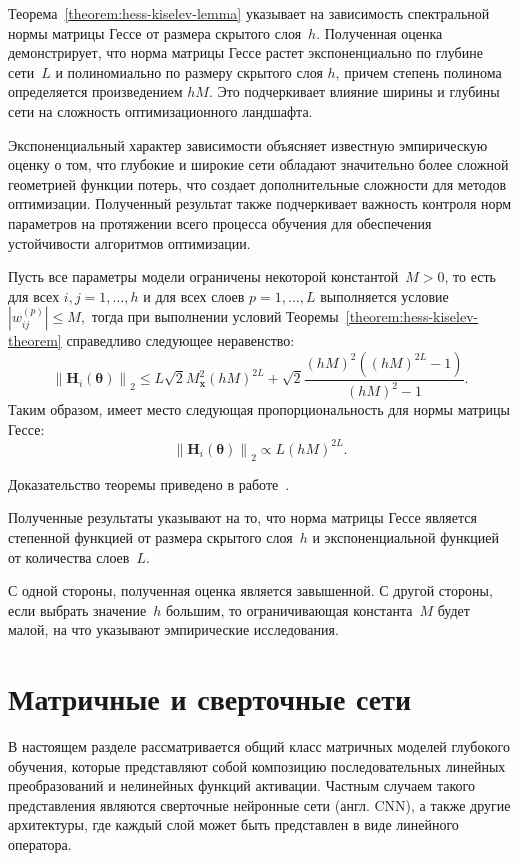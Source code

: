 Теорема~\ref{theorem:hess-kiselev-lemma} указывает на зависимость спектральной нормы матрицы Гессе от размера скрытого слоя~$h$. Полученная оценка демонстрирует, что норма матрицы Гессе растет экспоненциально по глубине сети~$L$ и полиномиально по размеру скрытого слоя $h$, причем степень полинома определяется произведением $hM$. Это подчеркивает влияние ширины и глубины сети на сложность оптимизационного ландшафта.

Экспоненциальный характер зависимости объясняет известную эмпирическую оценку о том, что глубокие и широкие сети обладают значительно более сложной геометрией функции потерь, что создает дополнительные сложности для методов оптимизации. Полученный результат также подчеркивает важность контроля норм параметров на протяжении всего процесса обучения для обеспечения устойчивости алгоритмов оптимизации.

\begin{theorem}\label{theorem:hess-kiselev-lemma}
    Пусть все параметры модели ограничены некоторой константой~$M > 0$, то есть для всех $i, j = 1, \ldots, h$ и для всех слоев $p = 1, \ldots, L$ выполняется условие~$|w_{ij}^{(p)}| \leqslant M,$ тогда при выполнении условий Теоремы~\ref{theorem:hess-kiselev-theorem} справедливо следующее неравенство:
    \[ 
        \left\| \mathbf{H}_i(\boldsymbol{\theta}) \right\|_2 \leqslant L \sqrt{2} M_{\mathbf{x}}^2 (hM)^{2L} + \sqrt{2} \dfrac{(hM)^2 ((hM)^{2L} - 1)}{(hM)^2 - 1}.
    \]
    Таким образом, имеет место следующая пропорциональность для нормы матрицы Гессе:
    \[
        \left\| \mathbf{H}_i(\boldsymbol{\theta}) \right\|_2 \propto L (hM)^{2L}.
    \]
\end{theorem}
Доказательство теоремы приведено в работе~\cite{grabovoi2024unraveling748584228}.

Полученные результаты указывают на то, что норма матрицы Гессе является степенной функцией от размера скрытого слоя~$h$ и экспоненциальной функцией от количества слоев~$L$.

С одной стороны, полученная оценка является завышенной. С другой стороны, если выбрать значение~$h$ большим, то ограничивающая константа~$M$ будет малой, на что указывают эмпирические исследования.

\section{Матричные и сверточные сети}

В настоящем разделе рассматривается общий класс матричных моделей глубокого обучения, которые представляют собой композицию последовательных линейных преобразований и нелинейных функций активации. Частным случаем такого представления являются сверточные нейронные сети (англ. CNN), а также другие архитектуры, где каждый слой может быть представлен в виде линейного оператора.


